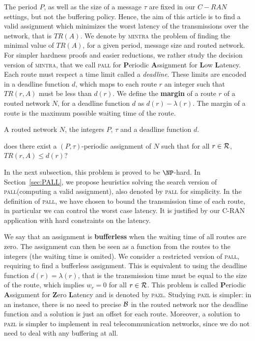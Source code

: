 \documentclass[a4paper,10pt]{article}
\newcommand\pazl{\textsc{pazl}\xspace}
\newcommand\pall{\textsc{pall}\xspace}
\newcommand\mintra{\textsc{mintra}\xspace}
\begin{document}
      	The period $P$, as well as the size of a message $\tau$ are fixed in our $C-RAN$ settings, but not the buffering policy. Hence, the aim of this article is to find a valid assignment which minimizes the worst latency of the transmissions over the network, that is $TR(A)$. We denote by \mintra the problem of finding the minimal value of $TR(A)$, for a given period, message size and routed network.
      	For simpler hardness proofs and easier reductions, we rather study the decision version of \mintra, that we call \pall for \textbf{P}eriodic \textbf{A}ssignment for \textbf{L}ow \textbf{L}atency. Each route must respect a time limit called a \emph{deadline}. These limits are encoded in a deadline function $d$, which maps to each route $r$ an integer such that $TR(r,A)$ must be less than $d(r)$.
      	We define the \textbf{margin} of a route $r$ of a routed network $N$, for a deadline function $d$ as 
        $ d(r) - \lambda(r)$. The margin of a route is the maximum possible waiting time of the route.

     

        A routed network $N$, the integers $P$, $\tau$ and a deadline function $d$.
      
       does there exist a $(P,\tau)$-periodic assignment of $N$ such that for all $r \in {\cal R}$, $TR(r,A) \leq d(r)$?

	  In the next subsection, this problem is proved to be $\NP$-hard. In Section~\ref{sec:PALL}, we propose heuristics solving the search version of \pall (computing a valid assignment), also denoted by \pall for simplicity. In the definition of \pall, we have chosen to bound the transmission time of each route, in particular we can control the worst case latency. It is justified by our C-RAN application with hard constraints on the latency. 

	 We say that an assignment is \textbf{bufferless} when the waiting time of all routes are zero.
	 The assignment can then be seen as a function from the routes to the integers (the waiting time is omited). We consider a restricted version of \pall, requiring to find a bufferless assignment. This is equivalent to using the deadline function $d(r) = \lambda(r)$, that is the 
     transmission time must be equal to the size of the route, which implies $w_r = 0$ for all $r \in \cal{R}$. This problem is called \textbf{P}eriodic \textbf{A}ssignment for \textbf{Z}ero \textbf{L}atency and is denoted by \pazl. Studying \pazl is simpler: in an instance, there is no need to precise $\cal{B}$ in the routed network nor the deadline function and a solution is just an offset for each route.  Moreover, a solution to \pazl is simpler to implement in real telecommunication networks, since we do not need to deal with any buffering at all.
\end{document}
